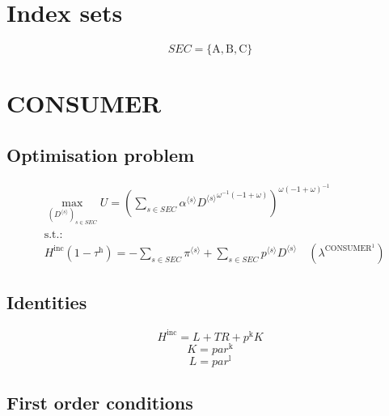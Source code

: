 

\section*{Index sets}

$${S\!E\!C} = \{ \mathrm{A}, \mathrm{B}, \mathrm{C} \}$$

\section{CONSUMER}

\subsection{Optimisation problem}

\begin{align}
&\max_{\left({D}^{\langle s\rangle}\right)_{s\in {S\!E\!C}}
} U = \left(\sum_{s\in {S\!E\!C}} {{\alpha}^{\langle s\rangle}} {{{D}^{\langle s\rangle}}^{{\omega}^{-1} \left(-1 + \omega\right)}}\right)^{{\omega} \left(-1 + \omega\right)^{-1}}\\
&\mathrm{s.t.:}\nonumber\\
& {H^{\mathrm{inc}}} \left(1 - \tau^{\mathrm{h}}\right) = -\sum_{s\in {S\!E\!C}} {\pi}^{\langle s\rangle} + \sum_{s\in {S\!E\!C}} {{p}^{\langle s\rangle}} {{D}^{\langle s\rangle}} \quad \left(\lambda^{\mathrm{CONSUMER}^{\mathrm{1}}}\right)
\end{align}


\subsection{Identities}

\begin{equation}
H^{\mathrm{inc}} = L + {T\!R} + {p^{\mathrm{k}}} {K}
\end{equation}
\begin{equation}
K = {p\!a\!r}^{\mathrm{k}}
\end{equation}
\begin{equation}
L = {p\!a\!r}^{\mathrm{l}}
\end{equation}


\subsection{First order conditions}

